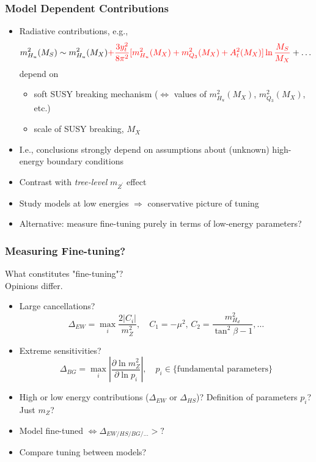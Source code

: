 \documentclass[10pt,aspectratio=169]{beamer}
\begin{document}
\begin{frame}
  \frametitle{Model Dependent Contributions}
  \begin{itemize} \itemsep1em
    \item Radiative contributions, e.g.,
      \begin{equation*}
        m_{H_u}^2(M_S) \sim m_{H_u}^2(M_X) {\color{red}
          + \frac{3 y_t^2}{8\pi^2}
          [ m_{H_u}^2(M_X) + m_{Q_3}^2(M_X) + A_t^2(M_X) ] \ln \frac{M_S}{M_X}
          } + \ldots
      \end{equation*}
      depend on
      \begin{itemize}
        \item soft SUSY breaking mechanism ($\Leftrightarrow$ values of
          $m_{H_u}^2(M_X)$, $m_{Q_3}^2(M_X)$, etc.)
        \item scale of SUSY breaking, $M_X$
      \end{itemize}
    \item I.e., conclusions strongly depend on assumptions about (unknown)
      high-energy boundary conditions
    \item Contrast with \emph{tree-level} $m_{Z^\prime}$ effect
    \item Study models at low energies $\Rightarrow$ {\color{blue}
        conservative picture of tuning}
    \item Alternative: {\color{orange} measure fine-tuning} purely in terms
      of low-energy parameters?
  \end{itemize}
\end{frame}

\begin{frame}
  \frametitle{Measuring Fine-tuning?}
  \begin{center}
    What constitutes "fine-tuning"? \\
    Opinions differ.
  \end{center}
  \begin{itemize} \itemsep1em
    \item Large cancellations?
      \begin{equation*}
        \Delta_{EW} = \max_i \frac{2|C_i|}{m_Z^2}, \quad C_1 = -\mu^2, \,
        C_2 = \frac{m_{H_d}^2}{\tan^2\beta - 1}, \ldots
      \end{equation*}
    \item Extreme sensitivities?
      \begin{equation*}
        \Delta_{BG} = \max_i \left | \frac{\partial \ln m_Z^2}
        {\partial \ln p_i} \right | , \quad p_i \in \{\text{fundamental
        parameters}\}
      \end{equation*}
    \item High or low energy contributions ($\Delta_{EW}$ or $\Delta_{HS}$)?
      Definition of parameters $p_i$? Just $m_Z$?
    \item Model fine-tuned $\Leftrightarrow \Delta_{EW/HS/BG/\ldots} > ?$
    \item Compare tuning between models?
  \end{itemize}
\end{frame}
\end{document}
